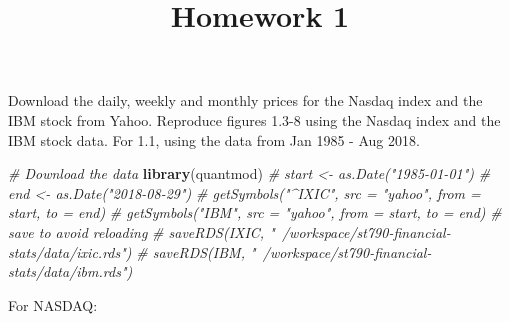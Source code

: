\documentclass[11pt,]{article}
\title{Homework 1  }
\author{\Large \vspace{0.05in} \newline\normalsize\emph{}  }
\date{}
\newcommand*{\authorfont}{\fontfamily{phv}\selectfont}
\newenvironment{Shaded}{\begin{snugshade}}{\end{snugshade}}
\newcommand{\CommentTok}[1]{\textcolor[rgb]{0.56,0.35,0.01}{\textit{#1}}}
\newcommand{\KeywordTok}[1]{\textcolor[rgb]{0.13,0.29,0.53}{\textbf{#1}}}
\newcommand{\NormalTok}[1]{#1}
\begin{document}
%

{%
\setlength{\parindent}{0pt}
\thispagestyle{plain}
{\fontsize{18}{20}\selectfont\raggedright 
\maketitle  %

}

{
  \vskip 13.5pt\relax \normalsize\fontsize{11}{12} 
  \textbf{\authorfont } \hskip 15pt \emph{\small }   
  
}

}






\vskip 6.5pt



Download the daily, weekly and monthly prices for the Nasdaq index and
the IBM stock from Yahoo. Reproduce figures 1.3-8 using the Nasdaq index
and the IBM stock data. For 1.1, using the data from Jan 1985 - Aug
2018.

\begin{Shaded}
\begin{Highlighting}[]
\CommentTok{# Download the data}
\KeywordTok{library}\NormalTok{(quantmod)}
\CommentTok{# start <- as.Date("1985-01-01")}
\CommentTok{# end <- as.Date("2018-08-29")}
\CommentTok{# getSymbols("^IXIC", src = "yahoo", from = start, to = end)}
\CommentTok{# getSymbols("IBM", src = "yahoo", from = start, to = end)}
\CommentTok{# save to avoid reloading }
\CommentTok{# saveRDS(IXIC, "~/workspace/st790-financial-stats/data/ixic.rds")}
\CommentTok{# saveRDS(IBM, "~/workspace/st790-financial-stats/data/ibm.rds")}
\end{Highlighting}
\end{Shaded}

For NASDAQ:
\end{document}
